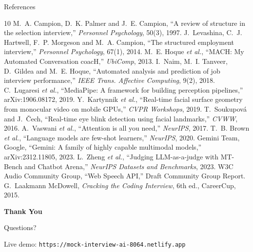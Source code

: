 \documentclass[aspectratio=169,11pt,xcolor=table]{beamer}
\begin{document}
\begin{frame}[allowframebreaks]{References}
  \scriptsize
  \begin{thebibliography}{10}
     M.~A. Campion, D.~K. Palmer and J.~E. Campion, ``A review of structure in the selection interview,'' \emph{Personnel Psychology}, 50(3), 1997.
     J.~Levashina, C.~J. Hartwell, F.~P. Morgeson and M.~A. Campion, ``The structured employment interview,'' \emph{Personnel Psychology}, 67(1), 2014.
     M.~E. Hoque \emph{et al.}, ``MACH: My Automated Conversation coacH,'' \emph{UbiComp}, 2013.
     I.~Naim, M.~I. Tanveer, D.~Gildea and M.~E. Hoque, ``Automated analysis and prediction of job interview performance,'' \emph{IEEE Trans. Affective Computing}, 9(2), 2018.
     C.~Lugaresi \emph{et al.}, ``MediaPipe: A framework for building perception pipelines,'' arXiv:1906.08172, 2019.
     Y.~Kartynnik \emph{et al.}, ``Real-time facial surface geometry from monocular video on mobile GPUs,'' \emph{CVPR Workshops}, 2019.
     T.~Soukupov\'{a} and J.~\v{C}ech, ``Real-time eye blink detection using facial landmarks,'' \emph{CVWW}, 2016.
     A.~Vaswani \emph{et al.}, ``Attention is all you need,'' \emph{NeurIPS}, 2017.
     T.~B. Brown \emph{et al.}, ``Language models are few-shot learners,'' \emph{NeurIPS}, 2020.
     Gemini Team, Google, ``Gemini: A family of highly capable multimodal models,'' arXiv:2312.11805, 2023.
     L.~Zheng \emph{et al.}, ``Judging LLM-as-a-judge with MT-Bench and Chatbot Arena,'' \emph{NeurIPS Datasets and Benchmarks}, 2023.
     W3C Audio Community Group, ``Web Speech API,'' Draft Community Group Report.
     G.~Laakmann McDowell, \emph{Cracking the Coding Interview}, 6th ed., CareerCup, 2015.
  \end{thebibliography}
\end{frame}

\begin{frame}[plain]
  \vfill
  \begin{center}
    {\color{white}\Huge\bfseries Thank You\par}
    \vspace{0.4cm}
    {\color{white!85!coral}\Large Questions?\par}
    \vspace{0.8cm}
    {\color{white!80}\small Live demo: \texttt{https://mock-interview-ai-8064.netlify.app}\par}
  \end{center}
  \vfill
\end{frame}
\end{document}
